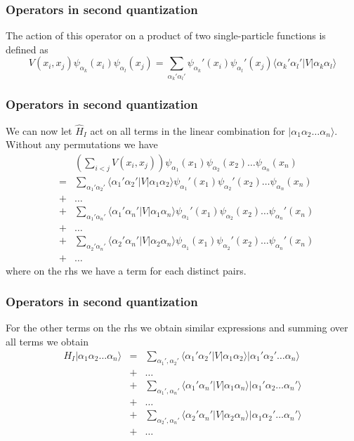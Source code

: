\documentclass[compress]{beamer}
\newcommand*{\ket}[1]{|#1\rangle}
\newcommand*{\bra}[1]{\langle#1|}
\newcommand{\element}[3]
        {\bra{#1}#2\ket{#3}}
\begin{document}
\frame
{
  \frametitle{Operators in second quantization}
\begin{small}
{\scriptsize
The action of this operator on a product of 
two single-particle functions is defined as 
\begin{equation}
	V(x_i,x_j) \psi_{\alpha_k}(x_i) \psi_{\alpha_l}(x_j) = \sum_{\alpha_k'\alpha_l'} 
		\psi_{\alpha_k}'(x_i)\psi_{\alpha_l}'(x_j) 
		\element{\alpha_k'\alpha_l'}{V}{\alpha_k\alpha_l} \label{eq:2-32}
\end{equation}
}
\end{small}
}


\frame
{
  \frametitle{Operators in second quantization}
\begin{small}
{\scriptsize
We can now let $\hat{H}_I$ act on all terms in the linear combination for $\ket{\alpha_1\alpha_2\dots\alpha_n}$. Without any permutations we have
\begin{eqnarray}
	&& \left( \sum_{i<j} V(x_i,x_j) \right) \psi_{\alpha_1}(x_1)\psi_{\alpha_2}(x_2)\dots \psi_{\alpha_n}(x_n) \nonumber \\
	&=& \sum_{\alpha_1'\alpha_2'} \element{\alpha_1'\alpha_2'}{V}{\alpha_1\alpha_2}
		\psi_{\alpha_1}'(x_1)\psi_{\alpha_2}'(x_2)\dots \psi_{\alpha_n}(x_n) \nonumber \\
	& +& \dots \nonumber \\
	&+& \sum_{\alpha_1'\alpha_n'} \element{\alpha_1'\alpha_n'}{V}{\alpha_1\alpha_n}
		\psi_{\alpha_1}'(x_1)\psi_{\alpha_2}(x_2)\dots \psi_{\alpha_n}'(x_n) \nonumber \\
	& +& \dots \nonumber \\
	&+& \sum_{\alpha_2'\alpha_n'} \element{\alpha_2'\alpha_n'}{V}{\alpha_2\alpha_n}
		\psi_{\alpha_1}(x_1)\psi_{\alpha_2}'(x_2)\dots \psi_{\alpha_n}'(x_n) \nonumber \\
	 & +& \dots \label{eq:2-33}
\end{eqnarray}
where on the rhs we have a term for each distinct pairs. 
}
\end{small}
}



\frame
{
  \frametitle{Operators in second quantization}
\begin{small}
{\scriptsize
For the other terms on the rhs we obtain similar expressions  and summing over all terms we obtain
\begin{eqnarray}
	H_I \ket{\alpha_1\alpha_2\hdots\alpha_n} &=& \sum_{\alpha_1', \alpha_2'} \element{\alpha_1'\alpha_2'}{V}{\alpha_1\alpha_2}
		\ket{\alpha_1'\alpha_2'\hdots\alpha_n} \nonumber \\
	&+& \hdots \nonumber \\
	&+& \sum_{\alpha_1', \alpha_n'} \element{\alpha_1'\alpha_n'}{V}{\alpha_1\alpha_n}
		\ket{\alpha_1'\alpha_2\hdots\alpha_n'} \nonumber \\
	&+& \hdots \nonumber \\
	&+& \sum_{\alpha_2', \alpha_n'} \element{\alpha_2'\alpha_n'}{V}{\alpha_2\alpha_n}
		\ket{\alpha_1\alpha_2'\hdots\alpha_n'} \nonumber \\
	 &+& \hdots \label{eq:2-34}
\end{eqnarray}
}
\end{small}
}
\end{document}
